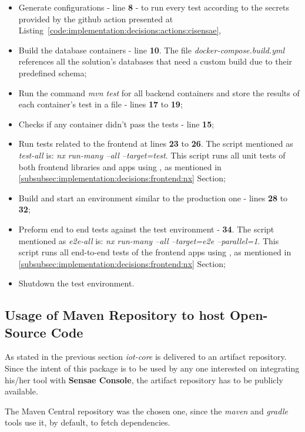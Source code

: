 \begin{itemize}
    \item Generate configurations - line \textbf{8} - to run every test according to the secrets provided by the github action presented at Listing~\ref{code:implementation:decisions:actions:cisensae},
    \item Build the database containers - line \textbf{10}. The file \textit{docker-compose.build.yml} references all the solution's databases that need a custom build due to their predefined schema;
    \item Run the command \textit{mvn test} for all backend containers and store the results of each container's test in a file - lines \textbf{17} to \textbf{19};
    \item Checks if any container didn't pass the tests - line \textbf{15};
    \item Run tests related to the frontend at lines \textbf{23} to \textbf{26}. The script mentioned as \textit{test-all} is: \textit{nx run-many --all --target=test}. This script runs all unit tests of both frontend libraries and apps using , as mentioned in \ref{subsubsec:implementation:decisions:frontend:nx} Section;
    \item Build and start an environment similar to the production one - lines \textbf{28} to \textbf{32};
    \item Preform end to end tests against the test environment - \textbf{34}. The script mentioned as \textit{e2e-all} is: \textit{nx run-many --all --target=e2e --parallel=1}. This script runs all end-to-end tests of the frontend apps using , as mentioned in \ref{subsubsec:implementation:decisions:frontend:nx} Section;
    \item Shutdown the test environment.
\end{itemize}

\subsection{Usage of Maven Repository to host Open-Source Code}
\label{subsec:implementation:decisions:maven}

As stated in the previous section \textit{iot-core} is delivered to an artifact repository. Since the intent of this package is to be used by any one interested on integrating his/her tool with \textbf{Sensae Console}, the artifact repository has to be publicly available.

The Maven Central repository was the chosen one, since the \textit{maven} and \textit{gradle} tools use it, by default, to fetch dependencies.

